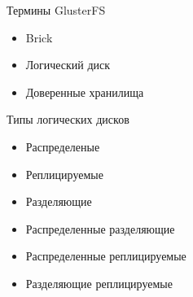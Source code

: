 \documentclass{beamer}
\begin{document}
\begin{frame}{Термины GlusterFS}
	\begin{itemize}

		\item Brick           %
		\item Логический диск %



		\item Доверенные хранилища
	\end{itemize}
\end{frame}

\begin{frame}{Типы логических дисков}
	\begin{itemize}
		\item Распределеные
		\item Реплицируемые
		\item Разделяющие
		\vspace{1cm}
		\item Распределенные разделяющие
		\item Распределенные реплицируемые
		\item Разделяющие реплицируемые
	\end{itemize}
\end{frame}
\end{document}
